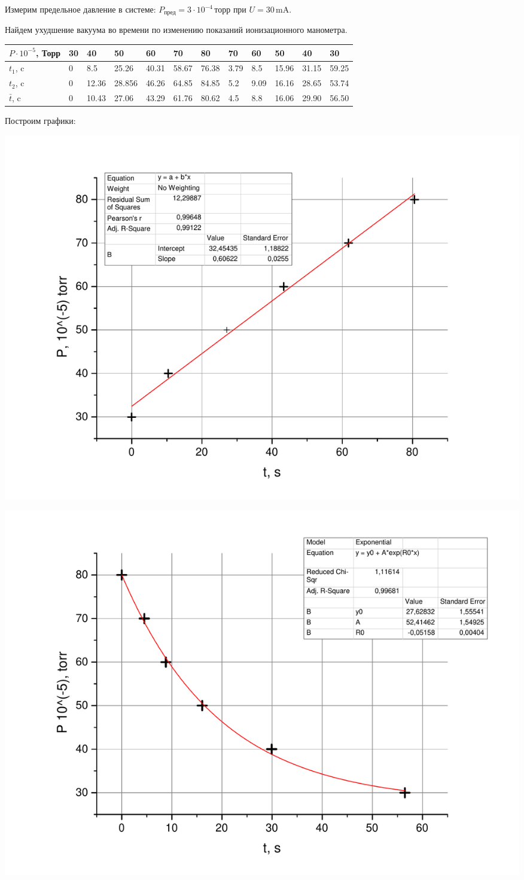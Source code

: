 \documentclass[a4paper,12pt]{article}
\begin{document}
	Измерим предельное давление в системе: $P_{\text{пред}} = 3 \cdot 10^{-4}\,\text{торр}$ при $U = 30 \,\text{mA}$.
	
	Найдем ухудшение вакуума во времени по изменению показаний ионизационного манометра.
	\begin{center}
	\begin{table}[h]
		\begin{tabular}{l|l|l|l|l|l|l|l|l|l|l|l}
			$P\cdot 10^{-5}$, Торр  & 30 & 40 & 50 & 60 & 70 & 80 & 70 & 60 & 50 & 40 & 30 \\ \hline
			$t_1$, c              & 0 & 8.5 & 25.26 & 40.31 & 58.67 & 76.38 & 3.79 & 8.5 & 15.96 & 31.15 & 59.25 \\
			$t_2$, c              & 0 & 12.36 & 28.856 & 46.26 & 64.85 & 84.85 & 5.2  & 9.09 & 16.16 & 28.65 & 53.74 \\
			$\bar{t}$, c        & 0 & 10.43 & 27.06 & 43.29 & 61.76 & 80.62 & 4.5 & 8.8 & 16.06 & 29.90 & 56.50 \\
		\end{tabular}
	\end{table}
	\end{center}
	Построим графики:
	
	\includegraphics[width = 0.8\linewidth]{graph_1}
	
	\includegraphics[width = 0.8\linewidth]{graph_2}
	
\end{document}
